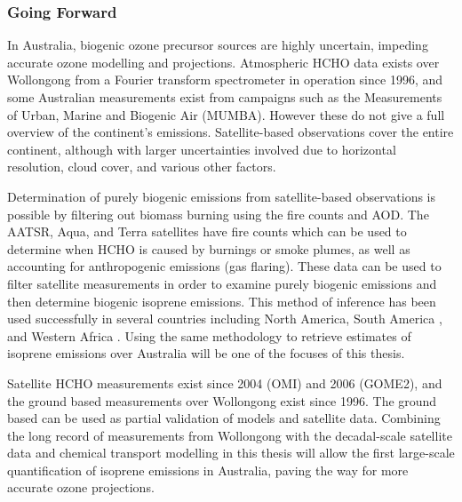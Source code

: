 \subsubsection{Going Forward}
In Australia, biogenic ozone precursor sources are highly uncertain, impeding accurate ozone modelling and projections.
Atmospheric HCHO data exists over Wollongong from a Fourier transform spectrometer in operation since 1996, and some Australian measurements exist from campaigns such as the Measurements of Urban, Marine and Biogenic Air (MUMBA).
However these do not give a full overview of the continent's emissions. Satellite-based observations cover the entire continent, although with larger uncertainties involved due to horizontal resolution, cloud cover, and various other factors. 

Determination of purely biogenic emissions from satellite-based observations is possible by filtering out biomass burning using the fire counts and AOD.
The AATSR, Aqua, and Terra satellites have fire counts which can be used to determine when HCHO is caused by burnings or smoke plumes, as well as accounting for anthropogenic emissions (gas flaring).
These data can be used to filter satellite measurements in order to examine purely biogenic emissions and then determine biogenic isoprene emissions.
This method of inference has been used successfully in several countries including North America\cite{Palmer_2003}, South America \cite{Barkley_2013}, and Western Africa \cite{Marais_2012}.
Using the same methodology to retrieve estimates of isoprene emissions over Australia will be one of the focuses of this thesis.

Satellite HCHO measurements exist since 2004 (OMI) and 2006 (GOME2), and the ground based measurements over Wollongong exist since 1996. The ground based can be used as partial validation of models and satellite data. 
Combining the long record of measurements from Wollongong with the decadal-scale satellite data and chemical transport modelling in this thesis will allow the first large-scale quantification of isoprene emissions in Australia, paving the way for more accurate ozone projections.
